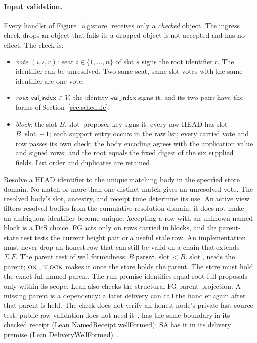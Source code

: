 \documentclass{article}
\theoremstyle{plain}
\theoremstyle{definition}
\theoremstyle{remark}
\newcommand{\slot}{\operatorname{slot}}
\newcommand{\parent}{\mathsf{parent}}
\newcommand{\valindex}{\mathsf{val\_index}}
\newcommand{\FAST}[1]{\cite[\S#1]{FAST}}
\begin{document}
\paragraph{Input validation.}  Every handler of
Figure~\ref{alg:store} receives only a \emph{checked} object.  The
ingress check drops an object that fails it; a dropped object is not
accepted and has no effect.  The check is:
\begin{itemize}[nosep]
\item \emph{vote} $(i,s,r)$: seat $i\in\{1,\dots,n\}$ of slot $s$
  signs the root identifier $r$. The identifier can be unresolved. Two
  same-seat, same-slot votes with the same identifier are one vote.
\item \emph{row}: $\valindex\in V$, the identity $\valindex$ signs it,
  and its two pairs have the forms of Section~\ref{sec:schedule};
\item \emph{block}: the slot-$B.\slot$ proposer key signs it; every raw
  HEAD has slot $B.\slot-1$; each support entry occurs in the raw list;
  every carried vote and row passes its own check; the body encoding agrees
  with the application value and signed rows; and the root equals the fixed
  digest of the six supplied fields. List order and duplicates are retained.
\end{itemize}
Resolve a HEAD identifier to the unique matching body in the specified
store domain. No match or more than one distinct match gives an unresolved
vote. The resolved body's slot, ancestry, and receipt time determine its
use. An active view filters resolved bodies from the cumulative resolution
domain; it does not make an ambiguous identifier become unique.
Accepting a row with an unknown named block is a DoS choice.
FG acts only on rows carried in blocks, and the parent-state test
tests the current height pair or a useful stale row.
An implementation must never drop an honest row that can still be valid on a chain that extends $\Sigma.F$.
The parent test of well formedness, $B.\parent.\slot<B.\slot$, needs the
parent; $\Call{on\_block}{}$ makes it once the store holds the parent.
The store must hold the exact full named parent. The run premise identifies
equal-root full proposals only within its scope. Lean also checks the
structural FG-parent projection. A missing parent is a dependency: a later
delivery can call the handler again after that parent is held.
The check does not verify an honest node's private fast-source test;
public row validation does not need it~\FAST{3.1}.  \cite{DC} has the
same boundary in its checked receipt (Lean
\textsf{NamedReceipt.wellFormed}); SA has it in its delivery premise
(Lean \textsf{DeliveryWellFormed})~\cite[M2]{RT}.
\end{document}
